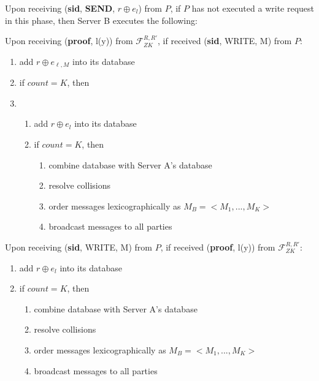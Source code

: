 \begin{tcolorbox}[colback=white, arc=5pt]

\extitem Upon receiving (\textbf{sid}, \textbf{SEND}, $r\oplus e_l$) from $P$, if $P$ has not executed a write request in this phase, then
    Server B executes the following:
    
    
    Upon receiving (\textbf{proof}, l(y)) from $\mathcal{F}_{ZK}^{R,R'}$, if received (\textbf{sid}, WRITE, M) from $P$:
    \begin{enumerate}
        \item add $r\oplus e_{\ell,M}$ into its database  
        \item if $count=K$, then
        \item 
        \begin{enumerate}
            \item add $r\oplus e_l$ into its database  
            \item if $count=K$, then
            \begin{enumerate}
                \item combine database with Server A's database
                \item resolve collisions
                \item order messages lexicographically as $M_B=<M_1,...,M_K>$
                \item broadcast messages to all parties
            \end{enumerate}
        \end{enumerate}
    \end{enumerate}
    Upon receiving (\textbf{sid}, WRITE, M) from $P$, if received (\textbf{proof}, l(y)) from $\mathcal{F}_{ZK}^{R,R'}$:
        \begin{enumerate}
            \item add $r\oplus e_l$ into its database  
            \item if $count=K$, then
            \begin{enumerate}
                \item combine database with Server A's database
                \item resolve collisions
                \item order messages lexicographically as $M_B=<M_1,...,M_K>$
                \item broadcast messages to all parties
            \end{enumerate}
        \end{enumerate}



\end{tcolorbox}
